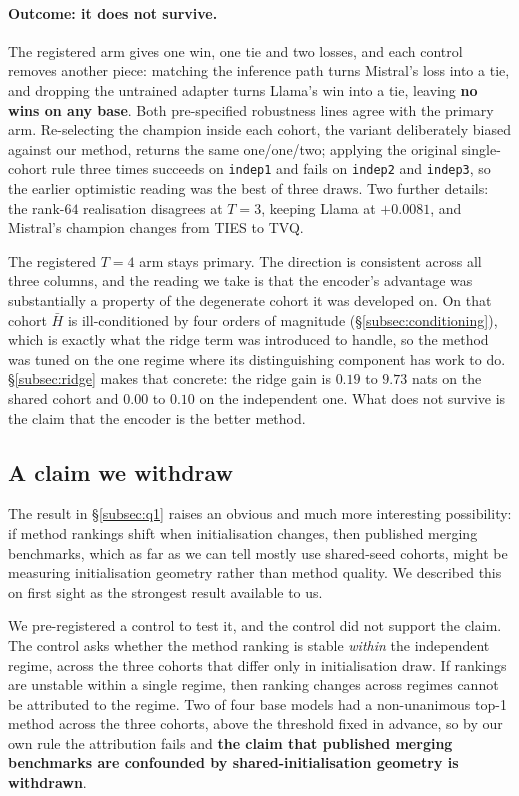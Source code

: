 \paragraph{Outcome: it does not survive.} The registered arm gives one win,
one tie and two losses, and each control removes another piece: matching
the inference path turns Mistral's loss into a tie, and dropping the
untrained adapter turns Llama's win into a tie, leaving \textbf{no wins on
any base}. Both pre-specified robustness lines agree with the primary arm.
Re-selecting the champion inside each cohort, the variant deliberately
biased against our method, returns the same one/one/two; applying the
original single-cohort rule three times succeeds on \texttt{indep1} and
fails on \texttt{indep2} and \texttt{indep3}, so the earlier optimistic
reading was the best of three draws. Two further details: the rank-$64$ realisation disagrees at $T=3$, keeping Llama at
$+0.0081$, and Mistral's champion changes from TIES to TVQ.

The registered $T = 4$ arm stays primary. The direction is consistent
across all three columns, and the reading we take is that the encoder's
advantage was substantially a property of the degenerate cohort it was
developed on. On that cohort $\bar H$ is ill-conditioned by four
orders of magnitude (\S\ref{subsec:conditioning}), which is exactly what
the ridge term was introduced to handle, so the method was tuned on the one
regime where its distinguishing component has work to do.
\S\ref{subsec:ridge} makes that concrete: the ridge gain is $0.19$ to
$9.73$ nats on the shared cohort and $0.00$ to $0.10$ on the independent
one. What does not survive is the claim that the encoder is the better
method.

\subsection{A claim we withdraw}
\label{subsec:withdrawn}

The result in \S\ref{subsec:q1} raises an obvious and much more
interesting possibility: if method rankings shift when initialisation
changes, then published merging benchmarks, which as far as we can tell
mostly use shared-seed cohorts, might be measuring initialisation
geometry rather than method quality. We described this on first sight as
the strongest result available to us.

We pre-registered a control to test it, and the control did not support
the claim. The control asks whether the method ranking is stable
\emph{within} the independent regime, across the three cohorts that
differ only in initialisation draw. If rankings are unstable within a
single regime, then ranking changes across regimes cannot be attributed
to the regime. Two of four base models had a non-unanimous top-1 method
across the three cohorts, above the threshold fixed in advance, so by our
own rule the attribution fails and \textbf{the claim that published
merging benchmarks are confounded by shared-initialisation geometry is
withdrawn}.


